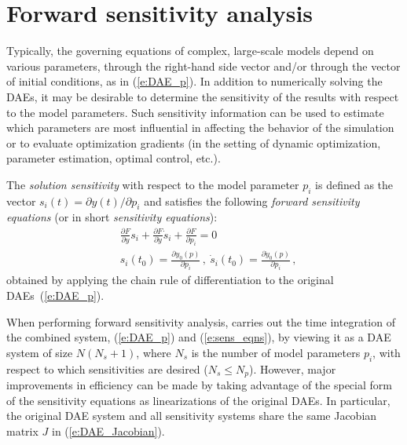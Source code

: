 \section{Forward sensitivity analysis}\label{ss:fwd_sensi}

Typically, the governing equations of complex, large-scale models
depend on various parameters,  through the right-hand side vector 
and/or through the vector of initial conditions, as in (\ref{e:DAE_p}).
In addition to numerically solving the DAEs, it may be desirable to
determine the sensitivity of the results with respect to the model
parameters. 
Such sensitivity information can be used to estimate which
parameters are most influential in affecting the behavior of the
simulation or to evaluate optimization gradients (in the setting of dynamic
optimization, parameter estimation, optimal control, etc.).

The {\em solution sensitivity} with respect to the model parameter
$p_i$ is defined as the vector 
$s_i (t) = {\partial y(t)}/{\partial p_i}$
and satisfies the following {\em forward sensitivity equations}
(or in short {\em sensitivity equations}):
\begin{equation}\label{e:sens_eqns}
\begin{split}
& \frac{\partial F}{\partial y} s_i + \frac{\partial F}{\partial \dot y} {\dot s_i} + \frac{\partial F}{\partial p_i} = 0\\
& s_i(t_0) = \frac{\partial y_{0}(p)}{\partial p_i} \, ,~ \dot s_i(t_0) =  \frac{\partial \dot y_{0}(p)}{\partial p_i} \, ,
\end{split}
\end{equation}
obtained by applying the chain rule of differentiation to the original DAEs~(\ref{e:DAE_p}). 


When performing forward sensitivity analysis, {\idas} carries out
the time integration of the combined system, (\ref{e:DAE_p}) and
(\ref{e:sens_eqns}), by viewing it as a DAE system of size
$N(N_s+1)$, where $N_s$ is the number of model parameters $p_i$, with
respect to which sensitivities are desired ($N_s \le N_p$).
However, major improvements in efficiency can be made by taking
advantage of the special form of the sensitivity equations as
linearizations of the original DAEs.  In particular, the original
DAE system and all sensitivity systems share the same Jacobian matrix
$J$ in (\ref{e:DAE_Jacobian}).

